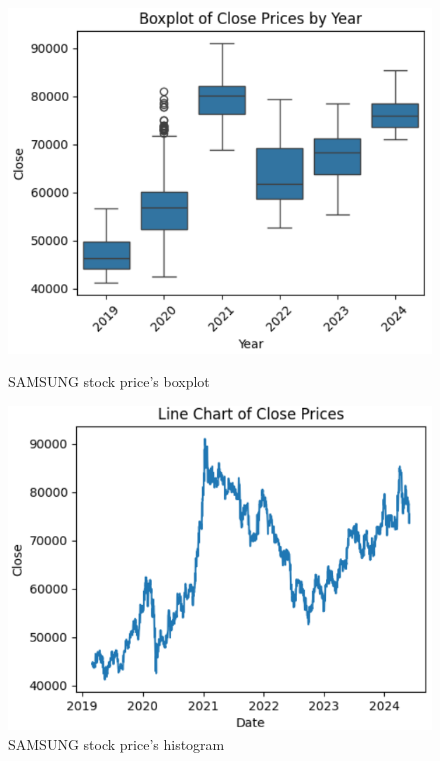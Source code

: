 \documentclass[conference]{IEEEtran}
\begin{document}
\begin{figure}[H]
    \centering
    \begin{minipage}{0.23\textwidth}
    \centering
    \includegraphics[width=1\textwidth]{Image/DatasetImg/SAMSUNG_Boxplot.png}
    \caption{SAMSUNG stock price's boxplot}
    \label{fig:1}
    \end{minipage}
    \hfill
    \begin{minipage}{0.23\textwidth}
    \centering
    \includegraphics[width=1\textwidth]{Image/DatasetImg/SAMSUNG_line_chart.png}
    \caption{SAMSUNG stock price's histogram}
    \label{fig:2}
    \end{minipage}
\end{figure}
\end{document}
